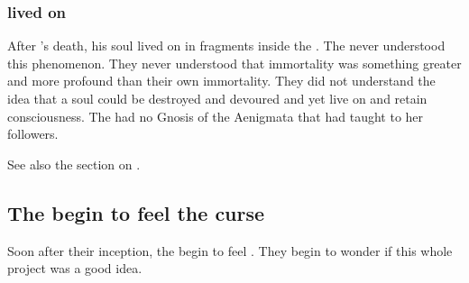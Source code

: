 \subsubsection{\Nexagglachel lived on}
After \Nexagglachel's death, his soul lived on in fragments inside the \satharioth.
The \resphain never understood this phenomenon. 
They never understood that \draconian immortality was something greater and more profound than their own immortality.
They did not understand the idea that a soul could be destroyed and devoured and yet live on and retain consciousness. 
The \resphain had no Gnosis of the Aenigmata that \KhothSell had taught to her followers.

See also the section on . 









\subsection{The \satharioth begin to feel the curse}
Soon after their inception, the \satharioth{} begin to feel . 
They begin to wonder if this whole project was a good idea.


